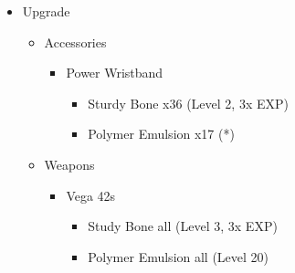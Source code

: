 \documentclass{report}
\begin{document}
\begin{upgrade}
\begin{itemize}
    \item Upgrade
    \begin{itemize}
        \item Accessories
        \begin{itemize}
            \item Power Wristband
            \begin{itemize}
                \item Sturdy Bone x36 (Level 2, 3x EXP)
                \item Polymer Emulsion x17 (*)
            \end{itemize}
        \end{itemize}
        \item Weapons
        \begin{itemize}
            \item Vega 42s
            \begin{itemize}
                \item Study Bone all (Level 3, 3x EXP)
                \item Polymer Emulsion all (Level 20)
            \end{itemize}
        \end{itemize}
    \end{itemize}
\end{itemize}
\end{upgrade}
\end{document}
